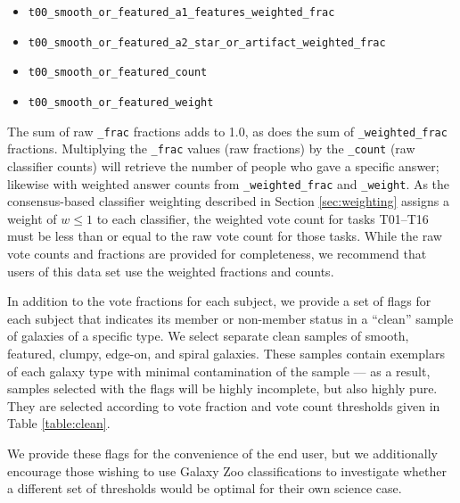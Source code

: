 \documentclass[useAMS,usenatbib]{mn2e}
\begin{document}
{\begin{itemize}
\item[] \small{\tt t00\_smooth\_or\_featured\_a1\_features\_weighted\_frac}

\item[] \small{\tt t00\_smooth\_or\_featured\_a2\_star\_or\_artifact\_weighted\_frac} 

\item[] \small{\tt t00\_smooth\_or\_featured\_count} 

\item[] \small{\tt t00\_smooth\_or\_featured\_weight}

\end{itemize}

The sum of raw  {\tt \_frac} fractions adds to 1.0, as does the sum of {\tt \_weighted\_frac} fractions. Multiplying the {\tt \_frac} values (raw fractions) by the {\tt \_count} (raw classifier counts) will retrieve the number of people who gave a specific answer; likewise with weighted answer counts from {\tt \_weighted\_frac} and {\tt \_weight}. As the consensus-based classifier weighting described in Section \ref{sec:weighting} assigns a weight of $w \leq 1$ to each classifier, the weighted vote count for tasks T01--T16 must be less than or equal to the raw vote count for those tasks. While the raw vote counts and fractions are provided for completeness, we recommend that users of this data set use the weighted fractions and counts.

In addition to the vote fractions for each subject, we provide a set of flags for each subject that indicates its member or non-member status in a ``clean'' sample of galaxies of a specific type. We select separate clean samples of smooth, featured, clumpy, edge-on, and spiral galaxies. These samples contain exemplars of each galaxy type with minimal contamination of the sample --- as a result, samples selected with the flags will be highly incomplete, but also highly pure. They are selected according to vote fraction and vote count thresholds given in Table \ref{table:clean}.

We provide these flags for the convenience of the end user, but we additionally encourage those wishing to use Galaxy Zoo classifications to investigate whether a different set of thresholds would be optimal for their own science case.


}
\end{document}
